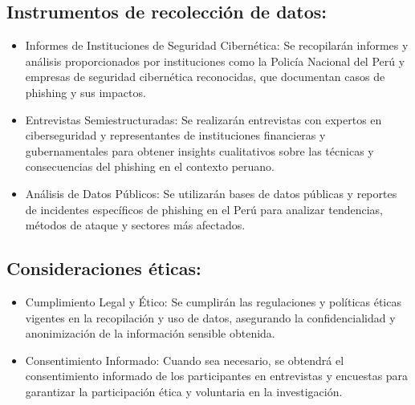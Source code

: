 \subsection{Instrumentos de recolección de datos:}
\begin{itemize}
    \item Informes de Instituciones de Seguridad Cibernética: Se recopilarán informes y análisis proporcionados por instituciones como la Policía Nacional del Perú y empresas de seguridad cibernética reconocidas, que documentan casos de phishing y sus impactos.
    \item Entrevistas Semiestructuradas: Se realizarán entrevistas con expertos en ciberseguridad y representantes de instituciones financieras y gubernamentales para obtener insights cualitativos sobre las técnicas y consecuencias del phishing en el contexto peruano.
    \item Análisis de Datos Públicos: Se utilizarán bases de datos públicas y reportes de incidentes específicos de phishing en el Perú para analizar tendencias, métodos de ataque y sectores más afectados.
\end{itemize}
\subsection{Consideraciones éticas:}
\begin{itemize}
    \item Cumplimiento Legal y Ético: Se cumplirán las regulaciones y políticas éticas vigentes en la recopilación y uso de datos, asegurando la confidencialidad y anonimización de la información sensible obtenida.
    \item Consentimiento Informado: Cuando sea necesario, se obtendrá el consentimiento informado de los participantes en entrevistas y encuestas para garantizar la participación ética y voluntaria en la investigación.
\end{itemize}
